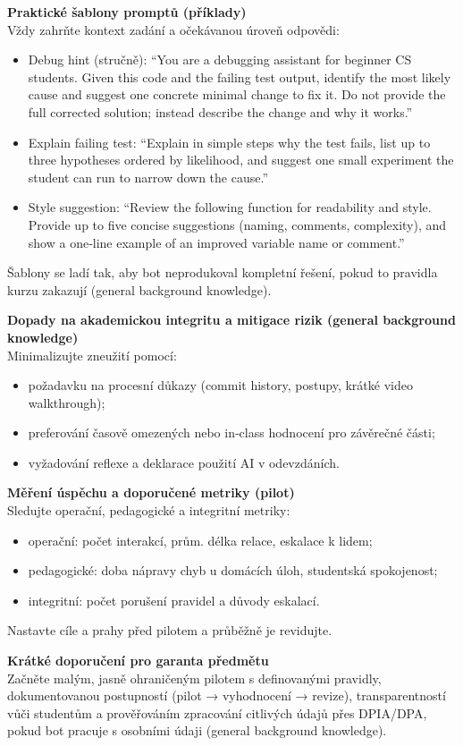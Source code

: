 \medskip
\textbf{Praktické šablony promptů (příklady)}\\
Vždy zahrňte kontext zadání a očekávanou úroveň odpovědi:
\begin{itemize}
  \item Debug hint (stručně): ``You are a debugging assistant for beginner CS students. Given this code and the failing test output, identify the most likely cause and suggest one concrete minimal change to fix it. Do not provide the full corrected solution; instead describe the change and why it works.''
  \item Explain failing test: ``Explain in simple steps why the test fails, list up to three hypotheses ordered by likelihood, and suggest one small experiment the student can run to narrow down the cause.''
  \item Style suggestion: ``Review the following function for readability and style. Provide up to five concise suggestions (naming, comments, complexity), and show a one‑line example of an improved variable name or comment.''
\end{itemize}
Šablony se ladí tak, aby bot neprodukoval kompletní řešení, pokud to pravidla kurzu zakazují (general background knowledge).

\medskip
\textbf{Dopady na akademickou integritu a mitigace rizik (general background knowledge)}\\
Minimalizujte zneužití pomocí:
\begin{itemize}
  \item požadavku na procesní důkazy (commit history, postupy, krátké video walkthrough);
  \item preferování časově omezených nebo in‑class hodnocení pro závěrečné části;
  \item vyžadování reflexe a deklarace použití AI v odevzdáních.
\end{itemize}

\medskip
\textbf{Měření úspěchu a doporučené metriky (pilot)}\\
Sledujte operační, pedagogické a integritní metriky:
\begin{itemize}
  \item operační: počet interakcí, prům. délka relace, eskalace k lidem;
  \item pedagogické: doba nápravy chyb u domácích úloh, studentská spokojenost;
  \item integritní: počet porušení pravidel a důvody eskalací.
\end{itemize}
Nastavte cíle a prahy před pilotem a průběžně je revidujte.

\medskip
\textbf{Krátké doporučení pro garanta předmětu}\\
Začněte malým, jasně ohraničeným pilotem s definovanými pravidly, dokumentovanou postupností (pilot → vyhodnocení → revize), transparentností vůči studentům a prověřováním zpracování citlivých údajů přes DPIA/DPA, pokud bot pracuje s osobními údaji (general background knowledge).